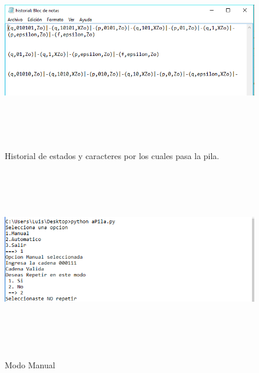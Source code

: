 \documentclass[12pt]{article}
\begin{document}
\begin{figure}[H]
\begin{center}
\includegraphics[width=\textwidth, height=8cm]{auto_pila_historial}
\label{ }
\caption{Historial de estados y caracteres por los cuales pasa la pila.}
\end{center}
\end{figure}

\begin{figure}[H]
\begin{center}
\includegraphics[width=\textwidth, height=8cm]{manual_pila}
\label{ }
\caption{Modo Manual}
\end{center}
\end{figure}
\end{document}
